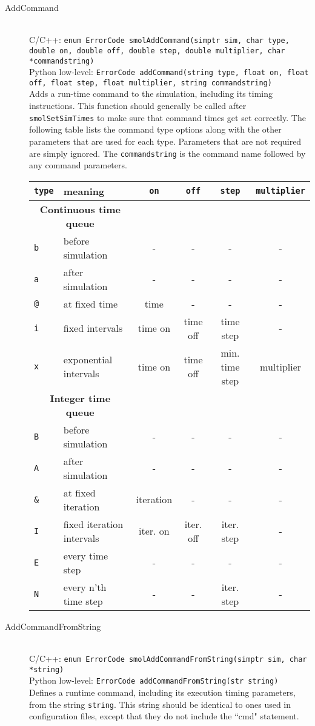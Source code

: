 \documentclass {book}
\newcommand {\ttt} {\texttt}
\begin{document}
\begin{description}
\item[AddCommand]
\hfill \\
C/C++: \ttt{enum ErrorCode smolAddCommand(simptr sim, char type, double on, double off, double step, double multiplier, char *commandstring)}\\
Python low-level: \ttt{ErrorCode addCommand(string type, float on, float off, float step, float multiplier, string commandstring)}\\
Adds a run-time command to the simulation, including its timing instructions. This function should generally be called after \ttt{smolSetSimTimes} to make sure that command times get set correctly. The following table lists the command type options along with the other parameters that are used for each type. Parameters that are not required are simply ignored. The \ttt{commandstring} is the command name followed by any command parameters.

\begin{longtable}[c]{ll|cccc}
\ttt{type} & meaning & \ttt{on} & \ttt{off} & \ttt{step} & \ttt{multiplier}\\
\hline
\multicolumn{2}{c}{\textbf{Continuous time queue}}\\
\ttt{b} & before simulation & - & - & - & -\\
\ttt{a} & after simulation & - & - & - & -\\
\ttt{@} & at fixed time & time & - & - & -\\
\ttt{i} & fixed intervals & time on & time off & time step & -\\
\ttt{x} & exponential intervals & time on & time off & min. time step & multiplier\\
\hline
\multicolumn{2}{c}{\textbf{Integer time queue}}\\
\ttt{B} & before simulation & - & - & - & -\\
\ttt{A} & after simulation & - & - & - & -\\
\ttt{\&} & at fixed iteration & iteration & - & - & -\\
\ttt{I} & fixed iteration intervals & iter. on & iter. off & iter. step & -\\
\ttt{E} & every time step & - & - & - & -\\
\ttt{N} & every n'th time step & - & - & iter. step & -\\
\end{longtable}

\item[AddCommandFromString]
\hfill \\
C/C++: \ttt{enum ErrorCode smolAddCommandFromString(simptr sim, char *string)}\\
Python low-level: \ttt{ErrorCode addCommandFromString(str string)}\\
Defines a runtime command, including its execution timing parameters, from the string \ttt{string}. This string should be identical to ones used in configuration files, except that they do not include the ``cmd" statement.


\end{description}
\end{document}
